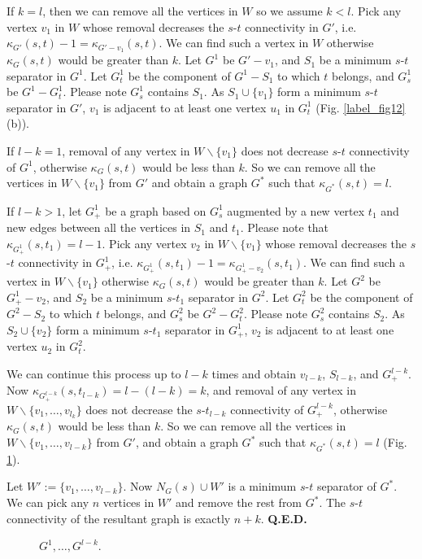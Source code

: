 \documentclass{article}
\begin{document}
If $k = l$, then we can remove all the vertices in $W$ so we assume $k < l$.
Pick any vertex $v_1$ in $W$ whose removal decreases the $s$-$t$ connectivity in $G'$,
i.e. $\kappa_{G'}(s, t) - 1 = \kappa_{G' - v_1}(s, t)$.
We can find such a vertex in $W$ otherwise $\kappa_G(s, t)$ would be greater than  $k$.
Let $G^1$ be $G' - v_1$, and $S_1$ be a minimum $s$-$t$ separator in $G^1$.
Let $G_t^1$ be the component of $G^1 - S_1$ to which $t$ belongs, and $G_s^1$ be $G^1 - G_t^1$.
Please note $G_s^1$ contains $S_1$.
As $S_1\cup\{v_1\}$ form a minimum $s$-$t$ separator in $G'$, $v_1$ is adjacent to at least
one vertex $u_1$ in $G_t^1$ (Fig. \ref{label_fig12}(b)).

If $l - k = 1$, removal of any vertex in $W\backslash\{v_1\}$ does not
decrease $s$-$t$ connectivity of $G^1$, otherwise $\kappa_G(s, t)$ would be less than $k$.
So we can remove all the vertices in $W\backslash\{v_1\}$ from $G'$ and obtain a graph $G^*$
such that $\kappa_{G^*}(s, t) = l$.

If $l - k > 1$, let $G_+^1$ be a graph based on $G_s^1$ augmented by a new vertex $t_1$ and
new edges between all the vertices in $S_1$ and $t_1$.
Please note that $\kappa_{G_+^1}(s, t_1) = l - 1$.
Pick any vertex $v_2$ in $W\backslash\{v_1\}$ whose removal decreases the $s$-$t$ connectivity
in $G_+^1$, i.e. $\kappa_{G_+^1}(s, t_1) - 1 = \kappa_{G_+^1 - v_2}(s, t_1)$.
We can find such a vertex in $W\backslash\{v_1\}$ otherwise $\kappa_G(s, t)$ would be greater than $k$.
Let $G^2$ be $G_+^1 - v_2$, and $S_2$ be a minimum $s$-$t_1$ separator in $G^2$.
Let $G_t^2$ be the component of $G^2 - S_2$ to which $t$ belongs, and $G_s^2$ be $G^2 - G_t^2$.
Please note $G_s^2$ contains $S_2$.
As $S_2\cup\{v_2\}$ form a minimum $s$-$t_1$ separator in $G_+^1$, $v_2$ is adjacent to at least
one vertex $u_2$ in $G_t^2$.

We can continue this process up to $l-k$ times and obtain $v_{l-k}$, $S_{l-k}$, and $G_+^{l-k}$.
Now $\kappa_{G_+^{l-k}}(s, t_{l-k}) = l - (l - k) = k$, and removal of any vertex in 
$W\backslash\{v_1, \ldots, v_{l_k}\}$ does not decrease the $s$-$t_{l-k}$ connectivity of $G_+^{l-k}$,
otherwise $\kappa_G(s, t)$ would be less than $k$.
So we can remove all the vertices in $W\backslash\{v_1, \ldots, v_{l-k}\}$ from $G'$,
and obtain a graph $G^*$ such that $\kappa_{G^*}(s, t) = l$ (Fig. \ref{label_fig13}).

Let $W' := \{v_1, \ldots, v_{l-k}\}$.
Now $N_G(s) \cup W'$ is a minimum $s$-$t$ separator of $G^*$.
We can pick any $n$ vertices in $W'$ and remove the rest from $G^*$.
The $s$-$t$ connectivity of the resultant graph is exactly $n + k$. {\bf Q.E.D.}

\begin{figure}\begin{center}
\caption[Fig13]{$G^1, \dots, G^{l-k}$.}
\label{label_fig13}
\end{center}\end{figure}



\end{document}
